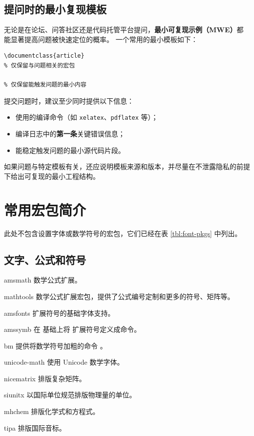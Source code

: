 \subsection{提问时的最小复现模板}\label{subsec:mwe-help}

无论是在论坛、问答社区还是代码托管平台提问，\textbf{最小可复现示例（MWE）}都能显著提高问题被快速定位的概率。
一个常用的最小模板如下：
\begin{verbatim}
\documentclass{article}
% 仅保留与问题相关的宏包

% 仅保留能触发问题的最小内容

\end{verbatim}

提交问题时，建议至少同时提供以下信息：
\begin{itemize}
  \item 使用的编译命令（如 \texttt{xelatex}、\texttt{pdflatex} 等）；
  \item 编译日志中的\textbf{第一条}关键错误信息；
  \item 能稳定触发问题的最小源代码片段。
\end{itemize}

如果问题与特定模板有关，还应说明模板来源和版本，并尽量在不泄露隐私的前提下给出可复现的最小工程结构。

\section{常用宏包简介}\label{sec:pkg-list}

\def\pkglabel#1{\makebox[60pt][l]{\pkg{#1}}}
\newenvironment{pkglist}%
  {\list{}{%
    \labelwidth=60pt
    \itemindent=0pt
    \leftmargin=60pt
    \labelsep=0pt
    \let\makelabel\pkglabel}}%
  {\endlist}

此处不包含设置字体或数学符号的宏包，它们已经在表 \ref{tbl:font-pkgs} 中列出。

\subsection{文字、公式和符号}\label{subsec:text-math-symbols}

\begin{pkglist}
  \item[amsmath]       数学公式扩展。
  \item[mathtools]    数学公式扩展宏包，提供了公式编号定制和更多的符号、矩阵等。
  \item[amsfonts]      扩展符号的基础字体支持。
  \item[amssymb]      在  基础上将  扩展符号定义成命令。
  \item[bm]           提供将数学符号加粗的命令 。
  \item[unicode-math] 使用 Unicode 数学字体。
  \item[nicematrix]   排版复杂矩阵。
  \item[siunitx]      以国际单位规范排版物理量的单位。
  \item[mhchem]       排版化学式和方程式。
  \item[tipa]         排版国际音标。
\end{pkglist}

